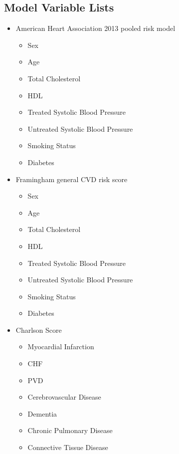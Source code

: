 \documentclass[a4paper,12pt]{article}
\begin{document}
   	\printbibliography[heading=none]
   	
   	\newpage
   	\begin{appendices}
   		
   		\section{Model Variable Lists}
   		\begin{itemize}
   			\item American Heart Association 2013 pooled risk model
   			\begin{itemize}
   				\item Sex
   				\item Age
   				\item Total Cholesterol
   				\item HDL
   				\item Treated Systolic Blood Pressure
   				\item Untreated Systolic Blood Pressure
   				\item Smoking Status
   				\item Diabetes
   			\end{itemize}
   			\item Framingham general CVD risk score
   			\begin{itemize}
   				\item Sex
   				\item Age
   				\item Total Cholesterol
   				\item HDL
   				\item Treated Systolic Blood Pressure
   				\item Untreated Systolic Blood Pressure
   				\item Smoking Status
   				\item Diabetes
   			\end{itemize}
   			\item Charlson Score
   			\begin{itemize}
   				\item Myocardial Infarction
   				\item CHF
   				\item PVD
   				\item Cerebrovascular Disease
   				\item Dementia
   				\item Chronic Pulmonary Disease
   				\item Connective Tissue Disease

\end{itemize}
\end{itemize}
\end{appendices}
\end{document}
